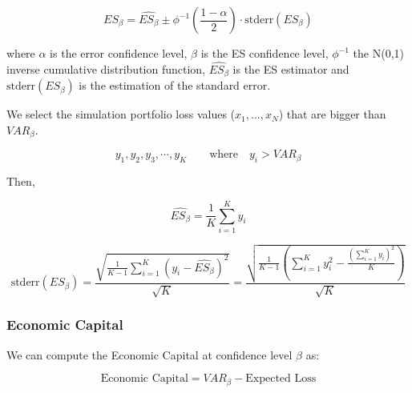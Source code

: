 \documentclass[a4paper,12pt,final]{article}
\begin{document}
\begin{displaymath}
ES_{\beta} = \widehat{ES_{\beta}} \pm \phi^{-1}\left(\frac{1-\alpha}{2}\right) \cdot \textrm{stderr}(ES_{\beta})
\end{displaymath}

where $\alpha$ is the error confidence level, $\beta$ is the ES confidence 
level, $\phi^{-1}$ the N(0,1) inverse cumulative distribution function, 
$\widehat{ES_{\beta}}$ is the ES estimator and $\textrm{stderr}(ES_{\beta})$
is the estimation of the standard error.
\newline

We select the simulation portfolio loss values ($x_1, ..., x_N$) that are bigger 
than $VAR_{\beta}$.

\begin{displaymath}
y_1, y_2, y_3, \cdots, y_K \qquad \textrm{where} \quad y_i > VAR_{\beta}
\end{displaymath}

Then,

\begin{displaymath}
\widehat{ES_{\beta}} = \frac{1}{K} \sum_{i=1}^{K} y_i
\end{displaymath}

\begin{displaymath}
\textrm{stderr}(ES_{\beta}) =
\frac{\sqrt{\frac{1}{K-1} \sum_{i=1}^{K} \left( y_i - \widehat{ES_{\beta}} \right)^2}}{\sqrt{K}} =
\frac{\sqrt{\frac{1}{K-1} \left( \sum_{i=1}^{K} y_i^2 - \frac{\left(\sum_{i=1}^{K} y_i \right)^2}{K} \right)}}{\sqrt{K}}
\end{displaymath}

\subsubsection{Economic Capital}
We can compute the Economic Capital at confidence level $\beta$ as:

\begin{displaymath}
\textrm{Economic Capital} = VAR_{\beta} - \textrm{Expected Loss}
\end{displaymath}

\end{document}
